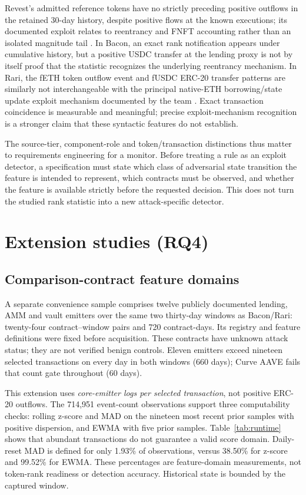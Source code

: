 \documentclass[preprint,12pt,authoryear]{elsarticle}
\begin{document}
Revest's admitted reference tokens have no strictly preceding positive outflows in the retained 30-day history, despite positive flows at the known executions; its documented exploit relates to reentrancy and FNFT accounting rather than an isolated magnitude tail \citep{Revest2022Postmortem,SlowMist2022Revest}. In Bacon, an exact rank notification appears under cumulative history, but a positive USDC transfer at the lending proxy is not by itself proof that the statistic recognizes the underlying reentrancy mechanism. In Rari, the fETH token outflow event and fUSDC ERC-20 transfer patterns are similarly not interchangeable with the principal native-ETH borrowing/state update exploit mechanism documented by the team \citep{Rari2022Postmortem}. Exact transaction coincidence is measurable and meaningful; precise exploit-mechanism recognition is a stronger claim that these syntactic features do not establish.

The source-tier, component-role and token/transaction distinctions thus matter to requirements engineering for a monitor. Before treating a rule as an exploit detector, a specification must state which class of adversarial state transition the feature is intended to represent, which contracts must be observed, and whether the feature is available strictly before the requested decision. This does not turn the studied rank statistic into a new attack-specific detector.

\section{Extension studies (RQ4)}\label{sec:extensions}
\subsection{Comparison-contract feature domains}
A separate convenience sample comprises twelve publicly documented lending, AMM and vault emitters over the same two thirty-day windows as Bacon/Rari: twenty-four contract--window pairs and 720 contract-days. Its registry and feature definitions were fixed before acquisition. These contracts have unknown attack status; they are not verified benign controls. Eleven emitters exceed nineteen selected transactions on every day in both windows (660 days); Curve AAVE fails that count gate throughout (60 days).

This extension uses \emph{core-emitter logs per selected transaction}, not positive ERC-20 outflows. The 714,951 event-count observations support three computability checks: rolling z-score and MAD on the nineteen most recent prior samples with positive dispersion, and EWMA with five prior samples. Table~\ref{tab:runtime} shows that abundant transactions do not guarantee a valid score domain. Daily-reset MAD is defined for only 1.93\% of observations, versus 38.50\% for z-score and 99.52\% for EWMA. These percentages are feature-domain measurements, not token-rank readiness or detection accuracy. Historical state is bounded by the captured window.
\end{document}
